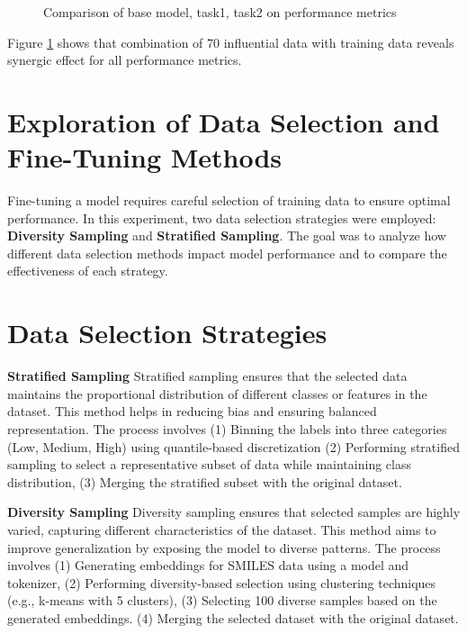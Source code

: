 \documentclass[11pt]{article}
\begin{document}
\begin{figure}[t]
    \centering
    \caption{Comparison of base model, task1, task2 on performance metrics }
    \label{fig:base_task1_task2}
\end{figure}

Figure \ref{fig:base_task1_task2} shows that combination of 70 influential data with training data reveals synergic effect for all performance metrics.   

\section*{Exploration of Data Selection and Fine-Tuning Methods}

Fine-tuning a model requires careful selection of training data to ensure optimal performance. In this experiment, two data selection strategies were employed: \textbf{Diversity Sampling} and \textbf{Stratified Sampling}. The goal was to analyze how different data selection methods impact model performance and to compare the effectiveness of each strategy.

\section*{Data Selection Strategies}
\textbf{Stratified Sampling} Stratified sampling ensures that the selected data maintains the proportional distribution of different classes or features in the dataset. This method helps in reducing bias and ensuring balanced representation. The process involves (1) Binning the labels into three categories (Low, Medium, High) using quantile-based discretization (2) Performing stratified sampling to select a representative subset of data while maintaining class distribution, (3) Merging the stratified subset with the original dataset.



\textbf{Diversity Sampling} Diversity sampling ensures that selected samples are highly varied, capturing different characteristics of the dataset. This method aims to improve generalization by exposing the model to diverse patterns. The process involves (1) Generating embeddings for SMILES data using a model and tokenizer, (2) Performing diversity-based selection using clustering techniques (e.g., k-means with 5 clusters), (3) Selecting 100 diverse samples based on the generated embeddings. (4) Merging the selected dataset with the original dataset.
\end{document}
